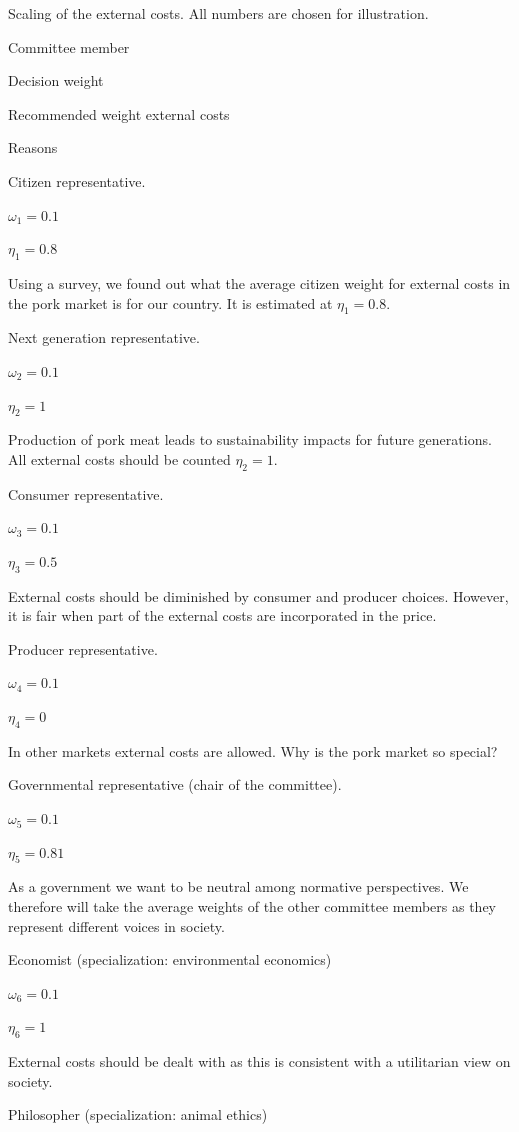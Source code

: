 \documentclass[
]{book}
\begin{document}
\label{tab:scalingexternal}Scaling of the external costs. All numbers are chosen for illustration.

Committee member

Decision weight

Recommended weight external costs

Reasons

Citizen representative.

\(\omega_1 = 0.1\)

\(\eta_1 = 0.8\)

Using a survey, we found out what the average citizen weight for external costs in the pork market is for our country. It is estimated at \(\eta_1=0.8\).

Next generation representative.

\(\omega_2 = 0.1\)

\(\eta_2 = 1\)

Production of pork meat leads to sustainability impacts for future generations. All external costs should be counted \(\eta_2=1\).

Consumer representative.

\(\omega_3 = 0.1\)

\(\eta_3 = 0.5\)

External costs should be diminished by consumer and producer choices. However, it is fair when part of the external costs are incorporated in the price.

Producer representative.

\(\omega_4 = 0.1\)

\(\eta_4 = 0\)

In other markets external costs are allowed. Why is the pork market so special?

Governmental representative (chair of the committee).

\(\omega_5 = 0.1\)

\(\eta_5 = 0.81\)

As a government we want to be neutral among normative perspectives. We therefore will take the average weights of the other committee members as they represent different voices in society.

Economist (specialization: environmental economics)

\(\omega_6 = 0.1\)

\(\eta_6 = 1\)

External costs should be dealt with as this is consistent with a utilitarian view on society.

Philosopher (specialization: animal ethics)
\end{document}
